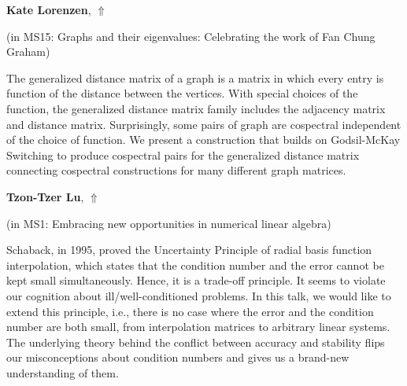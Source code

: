 \documentclass[ILAS2025-program.tex]{subfiles}
\begin{document}
\hypertarget{down0028}{}\begin{ilasabstract}
    
\textbf{Kate Lorenzen},  \hfill \hyperlink{up0028}{$\Uparrow$}
    
    
(in {\color{mstitle}MS15: Graphs and their eigenvalues: Celebrating the work of Fan Chung Graham})
        
\mtskip
    The generalized distance matrix of a graph is a matrix in which every entry is function of the distance between the vertices. With special choices of the function, the generalized distance matrix family includes the adjacency matrix and distance matrix. Surprisingly, some pairs of graph are cospectral independent of the choice of function.  We present a construction that builds on Godsil-McKay Switching to produce cospectral pairs for the generalized distance matrix connecting cospectral constructions for many different graph matrices.

\end{ilasabstract}
    

\hypertarget{down0070}{}\begin{ilasabstract}
    
\textbf{Tzon-Tzer Lu},  \hfill \hyperlink{up0070}{$\Uparrow$}
    
    
(in {\color{mstitle}MS1: Embracing new opportunities in numerical linear algebra})
        
\mtskip
    Schaback, in 1995, proved the Uncertainty Principle of radial basis function interpolation, which states that the condition number and the error cannot be kept small simultaneously. Hence, it is a trade-off principle. It seems to violate our cognition about ill/well-conditioned problems. In this talk, we would like to extend this principle, i.e., there is no case where the error and the condition number are both small, from interpolation matrices to arbitrary linear systems. The underlying theory behind the conflict between accuracy and stability flips our misconceptions about condition numbers and gives us a brand-new understanding of them. 
\end{ilasabstract}
    
\end{document}
